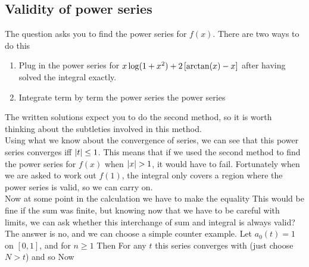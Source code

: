 \documentclass{article}
\begin{document}
\subsection{Validity of power series}
The question asks you to find the power series for $f(x)$. There are two ways to do this 
\begin{enumerate}
	\item Plug in the power series for $x\log(1+x^2) + 2\left[ \arctan(x)-x \right]$ after having solved the integral exactly.
	\item Integrate term by term the power series the power series 
\end{enumerate}
The written solutions expect you to do the second method, so it is worth thinking about the subtleties involved in this method. \\
Using what we know about the convergence of series, we can see that this power series converges iff $\left\lvert t \right\rvert\leq 1$. This means that if we used the second method to find the power series for $f(x)$ when $\left\lvert x \right\rvert>1$, it would have to fail. Fortunately when we are asked to work out $f(1)$, the integral only covers a region where the power series is valid, so we can carry on. \\
Now at some point in the calculation we have to make the equality 
This would be fine if the sum was finite, but knowing now that we have to be careful with limits, we can ask whether this interchange of sum and integral is always valid? The answer is no, and we can choose a simple counter example. Let $a_0(t)=1$ on $[0,1]$, and 
for $n \geq 1$ Then 
For any $t$ this series converges with
(just choose $N>t$) and so 
Now 
\end{document}
